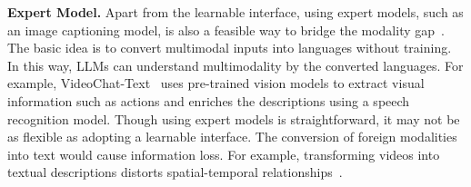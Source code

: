 \noindent \textbf{Expert Model.}
Apart from the learnable interface, using expert models, such as an image captioning model, is also a feasible way to bridge the modality gap~\cite{yin2023woodpecker,guo2023images,CAT,chatcaptioner}.
The basic idea is to convert multimodal inputs into languages without training.
In this way, LLMs can understand multimodality by the converted languages.
For example, VideoChat-Text~\cite{videochat} uses pre-trained vision models to extract visual information such as actions and enriches the descriptions using a speech recognition model. 
Though using expert models is straightforward, it may not be as flexible as adopting a learnable interface. The conversion of foreign modalities into text would cause information loss. For example, transforming videos into textual descriptions distorts spatial-temporal relationships~\cite{videochat}.

